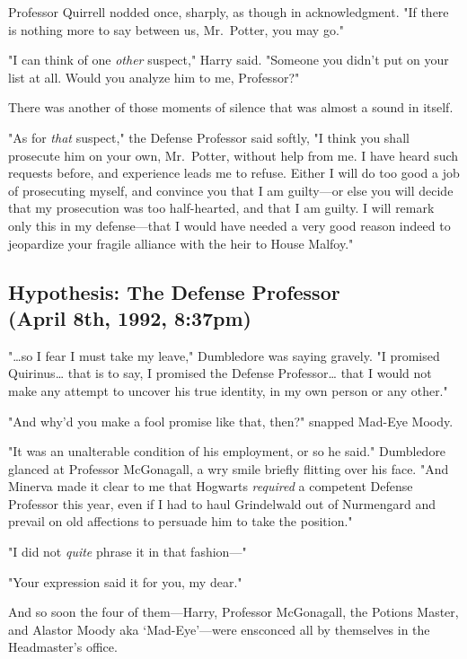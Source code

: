 Professor Quirrell nodded once, sharply, as though in acknowledgment. "If there 
is nothing more to say between us, Mr.~Potter, you may go."

"I can think of one \emph{other} suspect," Harry said. "Someone you didn't put 
on your list at all. Would you analyze him to me, Professor?"

There was another of those moments of silence that was almost a sound in itself.

"As for \emph{that} suspect," the Defense Professor said softly, "I think you 
shall prosecute him on your own, Mr.~Potter, without help from me. I have heard 
such requests before, and experience leads me to refuse. Either I will do too 
good a job of prosecuting myself, and convince you that I am guilty---or else 
you will decide that my prosecution was too half-hearted, and that I am guilty. 
I will remark only this in my defense---that I would have needed a very good 
reason indeed to jeopardize your fragile alliance with the heir to House 
Malfoy."
\sbreak
\vspace{-2\baselineskip}
\subsection{Hypothesis: The Defense Professor\\
(April 8th, 1992, 8:37pm)}

"{\ldots}so I fear I must take my leave," Dumbledore was saying gravely. "I 
promised Quirinus{\ldots} that is to say, I promised the Defense 
Professor{\ldots} that I would not make any attempt to uncover his true 
identity, in my own person or any other."

"And why'd you make a fool promise like that, then?" snapped Mad-Eye Moody.

"It was an unalterable condition of his employment, or so he said." Dumbledore 
glanced at Professor McGonagall, a wry smile briefly flitting over his face. 
"And Minerva made it clear to me that Hogwarts \emph{required} a competent 
Defense Professor this year, even if I had to haul Grindelwald out of 
Nurmengard and prevail on old affections to persuade him to take the position."

"I did not \emph{quite} phrase it in that fashion---"

"Your expression said it for you, my dear."

And so soon the four of them---Harry, Professor McGonagall, the Potions Master, 
and Alastor Moody aka `Mad-Eye'---were ensconced all by themselves in the 
Headmaster's office.

